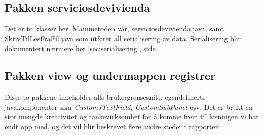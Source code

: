 \subsection*{Pakken serviciosdevivienda}
Det er to klasser her. Mainmetoden vår, serviciosdevivienda.java, samt SkrivTilLesFraFil.java som utfører all serialisering av data. Serialisering blir dokumentert nærmere her \ref{sec:serialisering}, side \pageref{sec:serialisering}.

\subsection*{Pakken view og undermappen registrer}
Disse to pakkene inneholder alle brukergrensesnitt, egendefinerte javakomponenter som \emph{CustomJTextField, CustomSubPanel} osv.
Det er brukt en stor mengde kreativitet og tankevirksomhet for å komme frem til løsningen vi har endt opp med, og det vil blir beskrevet flere andre steder i rapporten.



